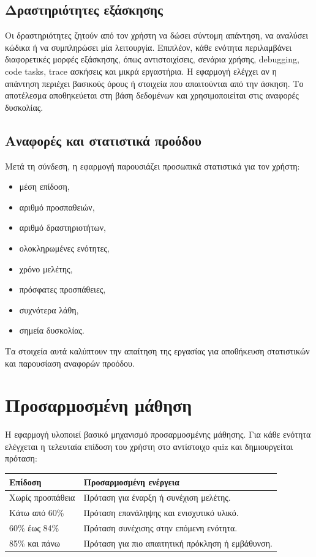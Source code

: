 \documentclass[12pt,a4paper]{article}
\begin{document}
\subsection{Δραστηριότητες εξάσκησης}

Οι δραστηριότητες ζητούν από τον χρήστη να δώσει σύντομη απάντηση, να αναλύσει κώδικα ή να συμπληρώσει μία λειτουργία. Επιπλέον, κάθε ενότητα περιλαμβάνει διαφορετικές μορφές εξάσκησης, όπως αντιστοιχίσεις, σενάρια χρήσης, debugging, code tasks, trace ασκήσεις και μικρά εργαστήρια. Η εφαρμογή ελέγχει αν η απάντηση περιέχει βασικούς όρους ή στοιχεία που απαιτούνται από την άσκηση. Το αποτέλεσμα αποθηκεύεται στη βάση δεδομένων και χρησιμοποιείται στις αναφορές δυσκολίας.

\subsection{Αναφορές και στατιστικά προόδου}

Μετά τη σύνδεση, η εφαρμογή παρουσιάζει προσωπικά στατιστικά για τον χρήστη:

\begin{itemize}[leftmargin=1.2cm]
  \item μέση επίδοση,
  \item αριθμό προσπαθειών,
  \item αριθμό δραστηριοτήτων,
  \item ολοκληρωμένες ενότητες,
  \item χρόνο μελέτης,
  \item πρόσφατες προσπάθειες,
  \item συχνότερα λάθη,
  \item σημεία δυσκολίας.
\end{itemize}

Τα στοιχεία αυτά καλύπτουν την απαίτηση της εργασίας για αποθήκευση στατιστικών και παρουσίαση αναφορών προόδου.

\section{Προσαρμοσμένη μάθηση}

Η εφαρμογή υλοποιεί βασικό μηχανισμό προσαρμοσμένης μάθησης. Για κάθε ενότητα ελέγχεται η τελευταία επίδοση του χρήστη στο αντίστοιχο quiz και δημιουργείται πρόταση:

\begin{longtable}{|p{4cm}|p{10cm}|}
\hline
\textbf{Επίδοση} & \textbf{Προσαρμοσμένη ενέργεια} \\
\hline
Χωρίς προσπάθεια & Πρόταση για έναρξη ή συνέχιση μελέτης. \\
\hline
Κάτω από 60\% & Πρόταση επανάληψης και ενισχυτικό υλικό. \\
\hline
60\% έως 84\% & Πρόταση συνέχισης στην επόμενη ενότητα. \\
\hline
85\% και πάνω & Πρόταση για πιο απαιτητική πρόκληση ή εμβάθυνση. \\
\hline
\end{longtable}
\end{document}
